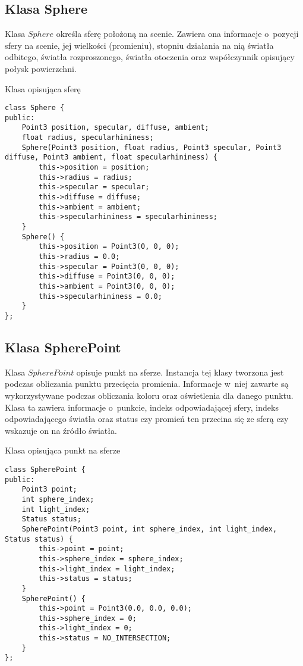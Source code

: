 \documentclass[11pt,a4paper,titlepage]{article}
\begin{document}
\subsection{Klasa Sphere}
Klasa $Sphere$ określa sferę położoną na scenie. Zawiera ona informacje o~pozycji sfery na scenie, jej wielkości (promieniu), stopniu działania na nią światła odbitego, światła rozproszonego, światła otoczenia oraz współczynnik opisujący połysk powierzchni.
\begin{listing}[H]
\caption{Klasa opisująca sferę}
\begin{verbatim}
class Sphere {
public:
	Point3 position, specular, diffuse, ambient;
	float radius, specularhininess;
	Sphere(Point3 position, float radius, Point3 specular, Point3 diffuse, Point3 ambient, float specularhininess) {
		this->position = position;
		this->radius = radius;
		this->specular = specular;
		this->diffuse = diffuse;
		this->ambient = ambient;
		this->specularhininess = specularhininess;
	}
	Sphere() {
		this->position = Point3(0, 0, 0);
		this->radius = 0.0;
		this->specular = Point3(0, 0, 0);
		this->diffuse = Point3(0, 0, 0);
		this->ambient = Point3(0, 0, 0);
		this->specularhininess = 0.0;
	}
};
\end{verbatim}
\end{listing}

\subsection{Klasa SpherePoint}
Klasa $SpherePoint$ opisuje punkt na sferze. Instancja tej klasy tworzona jest podczas obliczania punktu przecięcia promienia. Informacje w~niej zawarte są wykorzystywane podczas obliczania koloru oraz oświetlenia dla danego punktu. Klasa ta zawiera informacje o~punkcie, indeks odpowiadającej sfery, indeks odpowiadającego światła oraz status czy promień ten przecina się ze sferą czy wskazuje on na źródło światła.
\begin{listing}[H]
\caption{Klasa opisująca punkt na sferze}
\begin{verbatim}
class SpherePoint {
public:
	Point3 point;
	int sphere_index;
	int light_index;
	Status status;
	SpherePoint(Point3 point, int sphere_index, int light_index, Status status) {
		this->point = point;
		this->sphere_index = sphere_index;
		this->light_index = light_index;
		this->status = status;
	}
	SpherePoint() {
		this->point = Point3(0.0, 0.0, 0.0);
		this->sphere_index = 0;
		this->light_index = 0;
		this->status = NO_INTERSECTION;
	}
};
\end{verbatim}
\end{listing}
\end{document}
